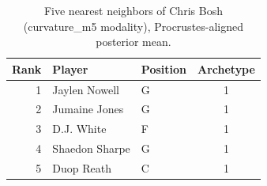 \begin{table}[htbp]
  \centering\small
  \begin{tabular}{rllc}
    \toprule
    Rank & Player & Position & Archetype \\
    \midrule
    1 & Jaylen Nowell & G & 1 \\
    2 & Jumaine Jones & G & 1 \\
    3 & D.J. White & F & 1 \\
    4 & Shaedon Sharpe & G & 1 \\
    5 & Duop Reath & C & 1 \\
    \bottomrule
  \end{tabular}
  \caption{Five nearest neighbors of Chris Bosh (curvature_m5 modality), Procrustes-aligned posterior mean.}
  \label{tab:Chris_Bosh_neighbors_curvature_m5}
\end{table}

